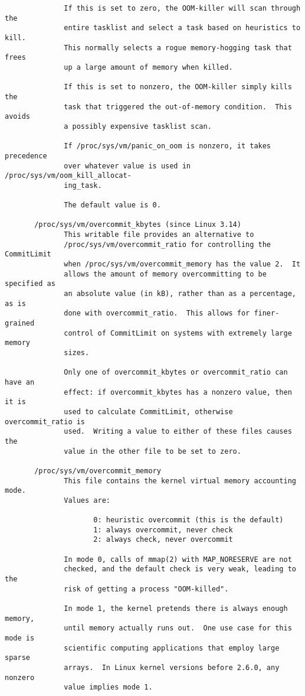 \documentclass[]{article}
\begin{document}
\begin{verbatim}
              If this is set to zero, the OOM-killer will scan through the
              entire tasklist and select a task based on heuristics to kill.
              This normally selects a rogue memory-hogging task that frees
              up a large amount of memory when killed.

              If this is set to nonzero, the OOM-killer simply kills the
              task that triggered the out-of-memory condition.  This avoids
              a possibly expensive tasklist scan.

              If /proc/sys/vm/panic_on_oom is nonzero, it takes precedence
              over whatever value is used in /proc/sys/vm/oom_kill_allocat‐
              ing_task.

              The default value is 0.

       /proc/sys/vm/overcommit_kbytes (since Linux 3.14)
              This writable file provides an alternative to
              /proc/sys/vm/overcommit_ratio for controlling the CommitLimit
              when /proc/sys/vm/overcommit_memory has the value 2.  It
              allows the amount of memory overcommitting to be specified as
              an absolute value (in kB), rather than as a percentage, as is
              done with overcommit_ratio.  This allows for finer-grained
              control of CommitLimit on systems with extremely large memory
              sizes.

              Only one of overcommit_kbytes or overcommit_ratio can have an
              effect: if overcommit_kbytes has a nonzero value, then it is
              used to calculate CommitLimit, otherwise overcommit_ratio is
              used.  Writing a value to either of these files causes the
              value in the other file to be set to zero.

       /proc/sys/vm/overcommit_memory
              This file contains the kernel virtual memory accounting mode.
              Values are:

                     0: heuristic overcommit (this is the default)
                     1: always overcommit, never check
                     2: always check, never overcommit

              In mode 0, calls of mmap(2) with MAP_NORESERVE are not
              checked, and the default check is very weak, leading to the
              risk of getting a process "OOM-killed".

              In mode 1, the kernel pretends there is always enough memory,
              until memory actually runs out.  One use case for this mode is
              scientific computing applications that employ large sparse
              arrays.  In Linux kernel versions before 2.6.0, any nonzero
              value implies mode 1.


\end{verbatim}
\end{document}
